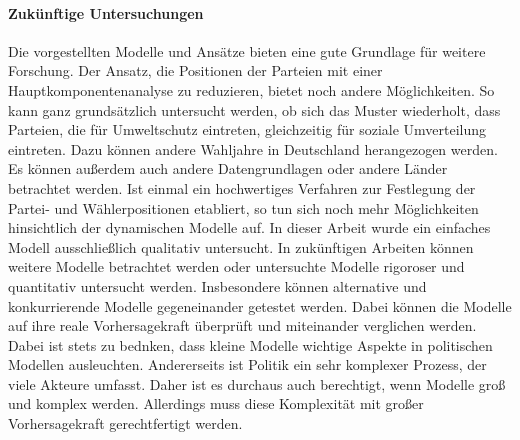 \paragraph{Zukünftige Untersuchungen}
Die vorgestellten Modelle und Ansätze bieten eine gute Grundlage für weitere Forschung. Der Ansatz, die Positionen der Parteien mit einer Hauptkomponentenanalyse zu reduzieren, bietet noch andere Möglichkeiten. So kann ganz grundsätzlich untersucht werden, ob sich das Muster wiederholt, dass Parteien, die für Umweltschutz eintreten, gleichzeitig für soziale Umverteilung eintreten. Dazu können andere Wahljahre in Deutschland herangezogen werden. Es können außerdem auch andere Datengrundlagen oder andere Länder betrachtet werden.
Ist einmal ein hochwertiges Verfahren zur Festlegung der Partei- und Wählerpositionen etabliert, so tun sich noch mehr Möglichkeiten hinsichtlich der dynamischen Modelle auf. In dieser Arbeit wurde ein einfaches Modell ausschließlich qualitativ untersucht. In zukünftigen Arbeiten können weitere Modelle betrachtet werden oder untersuchte Modelle rigoroser und quantitativ untersucht werden.
Insbesondere können alternative und konkurrierende Modelle gegeneinander getestet werden. Dabei können die Modelle auf ihre reale Vorhersagekraft überprüft und miteinander verglichen werden.
Dabei ist stets zu bednken, dass kleine Modelle wichtige Aspekte in politischen Modellen ausleuchten.
Andererseits ist Politik ein sehr komplexer Prozess, der viele Akteure umfasst. Daher ist es durchaus auch berechtigt, wenn Modelle groß und komplex werden. Allerdings muss diese Komplexität mit großer Vorhersagekraft gerechtfertigt werden.

\cleardoublepage